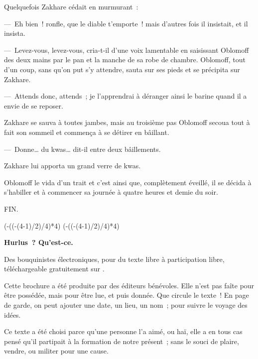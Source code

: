 \documentclass[french,twoside]{book} %
\def\truncdiv#1#2{((#1-(#2-1)/2)/#2)}
\def\moduloop#1#2{(#1-\truncdiv{#1}{#2}*#2)}
\def\modulo#1#2{\number\numexpr\moduloop{#1}{#2}\relax}
\begin{document}
Quelquefois Zakhare cédait en murmurant :\par
— Eh bien ! ronfle, que le diable t’emporte ! mais d’autres fois il insistait, et il insista.\par
— Levez-vous, levez-vous, cria-t-il d’une voix lamentable en saisissant Oblomoff des deux mains par le pan et la manche de sa robe de chambre. Oblomoff, tout d’un coup, sans qu’on put s’y attendre, sauta sur ses pieds et se précipita sur Zakhare.\par
— Attends donc, attends ; je l’apprendrai à déranger ainsi le barine quand il a envie de se reposer.\par
Zakhare se sauva à toutes jambes, mais au troisième pas Oblomoff secoua tout à fait son sommeil et commença à se détirer en bâillant.\par
— Donne… du kwas… dit-il entre deux bâillements.\par
Zakhare lui apporta un grand verre de kwas.\par
Oblomoff le vida d’un trait et c’est ainsi que, complètement éveillé, il se décida à s’habiller et à commencer sa journée à quatre heures et demie du soir.\par


\begin{raggedleft}FIN.\end{raggedleft}
 


\ifbooklet
  \pagestyle{empty}
  \clearpage
  \ifnum\modulo{\value{page}}{4}=0 \hbox{}\newpage\hbox{}\newpage\fi
  \ifnum\modulo{\value{page}}{4}=1 \hbox{}\newpage\hbox{}\newpage\fi


  \hbox{}\newpage
  \ifodd\value{page}\hbox{}\newpage\fi
  {\centering\color{rubric}\bfseries\noindent\large
    Hurlus ? Qu’est-ce.\par
    \bigskip
  }
  \noindent Des bouquinistes électroniques, pour du texte libre à participation libre,
  téléchargeable gratuitement sur \href{https://hurlus.fr}{}.\par
  \bigskip
  \noindent Cette brochure a été produite par des éditeurs bénévoles.
  Elle n’est pas faîte pour être possédée, mais pour être lue, et puis donnée.
  Que circule le texte !
  En page de garde, on peut ajouter une date, un lieu, un nom ; pour suivre le voyage des idées.
  \par

  Ce texte a été choisi parce qu’une personne l’a aimé,
  ou haï, elle a en tous cas pensé qu’il partipait à la formation de notre présent ;
  sans le souci de plaire, vendre, ou militer pour une cause.
  \par
\end{document}
